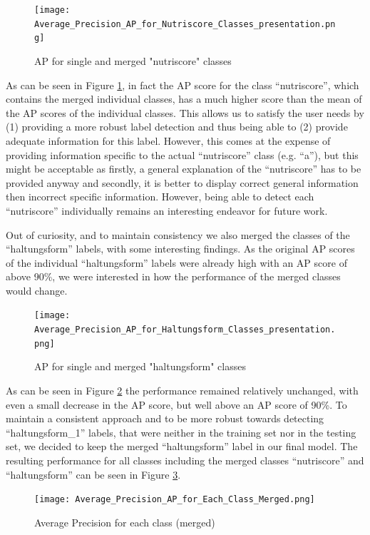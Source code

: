 \begin{figure}[H]
    \centering
    \texttt{[image: Average\_Precision\_AP\_for\_Nutriscore\_Classes\_presentation.png]}
    \caption{AP for single and merged "nutriscore" classes}
    \label{fig:ap_nutriscore}
\end{figure}

As can be seen in Figure \ref{fig:ap_nutriscore}, in fact the AP score for the class “nutriscore”, which contains the merged individual classes, has a much higher score than the mean of the AP scores of the individual classes. This allows us to satisfy the user needs by (1) providing a more robust label detection and thus being able to (2) provide adequate information for this label. However, this comes at the expense of providing information specific to the actual “nutriscore” class (e.g. “a”), but this might be acceptable as firstly, a general explanation of the “nutriscore” has to be provided anyway and secondly, it is better to  display correct general information then incorrect specific information. However, being able to detect each “nutriscore” individually remains an interesting endeavor for future work.

Out of curiosity, and to maintain consistency we also merged the classes of the “haltungsform” labels, with some interesting findings. As the original AP scores of the individual “haltungsform” labels were already high with an AP score of above 90\%, we were interested in how the performance of the merged classes would change. 

\begin{figure}[H]
    \centering
    \texttt{[image: Average\_Precision\_AP\_for\_Haltungsform\_Classes\_presentation.png]}
    \caption{AP for single and merged "haltungsform" classes}
    \label{fig:ap_haltungsform}
\end{figure}

As can be seen in Figure \ref{fig:ap_haltungsform}  the performance remained relatively unchanged, with even a small decrease in the AP score, but well above an AP score of 90\%. To maintain a consistent approach and to be more robust towards detecting “haltungsform\_1” labels, that were neither in the training set nor in the testing set, we decided to keep the merged “haltungsform” label in our final model. The resulting performance for all classes including the merged classes “nutriscore” and “haltungsform” can be seen in Figure \ref{fig:ap_merged}.

\begin{figure}[H]
    \centering
    \texttt{[image: Average\_Precision\_AP\_for\_Each\_Class\_Merged.png]}
    \caption{Average Precision for each class (merged)}
    \label{fig:ap_merged}
\end{figure}
 
